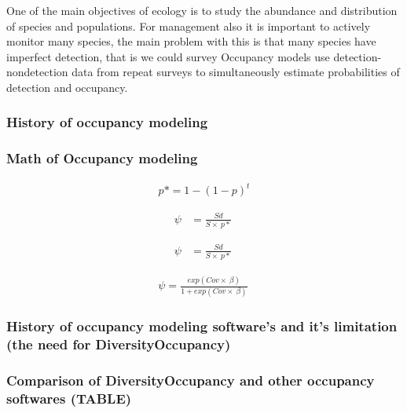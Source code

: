 \documentclass[article]{jss}
\begin{document}
One of the main objectives of ecology is to study the abundance and
distribution of species and populations. For management also it is
important to actively monitor many species, the main problem with this
is that many species have imperfect detection, that is we could survey
Occupancy models use detection-nondetection data from repeat surveys to
simultaneously estimate probabilities of detection and occupancy.

\subsubsection{History of occupancy
modeling}\label{history-of-occupancy-modeling}

\subsubsection{Math of Occupancy
modeling}\label{math-of-occupancy-modeling}

\[
\begin{aligned}
  \ p* = 1 -  \left( 1 - p \right)^t \
\end{aligned}
\]

\[
\begin{aligned}
  \psi & = \frac{Sd}{S \times\ p*} \
\end{aligned}
\]

\[
\begin{aligned}
  \psi & = \frac{Sd}{S \times\ p*} \
\end{aligned}
\]

\[
\begin{aligned}
  \psi = \frac{exp(Cov \times\ \beta)}{1 + exp(Cov \times\ \beta)} \
\end{aligned}
\]

\subsubsection{History of occupancy modeling software's and it's
limitation (the need for
DiversityOccupancy)}\label{history-of-occupancy-modeling-softwares-and-its-limitation-the-need-for-diversityoccupancy}

\subsubsection{Comparison of DiversityOccupancy and other occupancy
softwares
(TABLE)}\label{comparison-of-diversityoccupancy-and-other-occupancy-softwares-table}
\end{document}

